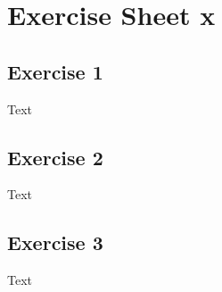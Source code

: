\documentclass[a4paper]{article}
\begin{document}
\section*{Exercise Sheet x}

\vspace{0,75cm}

\subsection*{Exercise 1}
Text

\vspace{0,75cm}

\subsection*{Exercise 2}
Text

\vspace{0,75cm}

\subsection*{Exercise 3}
Text
\end{document}
